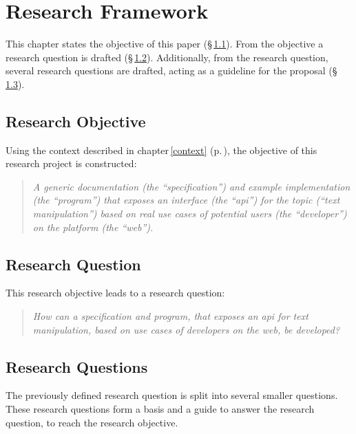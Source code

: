 \chapter{Research Framework}\label{research-framework}

This chapter states the objective of this paper (§\,\ref{research-objective}).
From the objective a research question is drafted
  (§\,\ref{research-question}).
Additionally, from the research question, several research questions are
  drafted, acting as a guideline for the proposal
  (§\,\ref{research-questions}).

\section{Research Objective}\label{research-objective}

Using the context described in chapter\,\ref{context} (p.\,\pageref{context}),
  the objective of this research project is constructed:

\begin{quote}
  \textit{A generic documentation (the ``specification'') and example
    implementation (the ``program'') that exposes an interface (the
    ``\acrshort{api}'') for the topic (``text manipulation'') based on real
    use cases of potential users (the ``developer'') on the platform (the
    ``web'').
  }
\end{quote}

\section{Research Question}\label{research-question}

This research objective leads to a research question:

\begin{quote}
  \textit{How can a specification and program, that exposes an \acrshort{api}
    for text manipulation, based on use cases of developers on the web,
    be developed?
  }
\end{quote}

\section{Research Questions}\label{research-questions}

The previously defined research question is split into several smaller
  questions.
These research questions form a basis and a guide to answer the research
  question, to reach the research objective.

